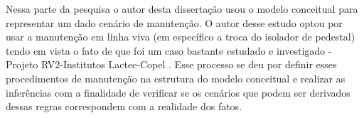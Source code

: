 Nessa parte da pesquisa o autor desta dissertação usou o modelo conceitual para representar um dado cenário de manutenção. O autor desse estudo optou por usar a manutenção em linha viva (em específico a troca do isolador de pedestal) tendo em vista o fato de que foi um caso bastante estudado e investigado - Projeto RV2-Institutos Lactec-Copel \cite{wesaac}. Esse processo se deu por definir esses procedimentos de manutenção na estrutura do modelo conceitual e realizar as inferências com a finalidade de verificar se os cenários que podem ser derivados dessas regras correspondem com a realidade dos fatos. 